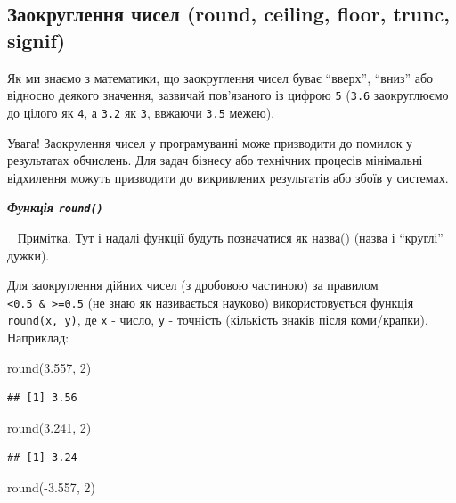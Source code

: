 \documentclass[
]{book}
\newenvironment{Shaded}{\begin{snugshade}}{\end{snugshade}}
\newcommand{\DecValTok}[1]{\textcolor[rgb]{0.00,0.00,0.81}{#1}}
\newcommand{\FloatTok}[1]{\textcolor[rgb]{0.00,0.00,0.81}{#1}}
\newcommand{\FunctionTok}[1]{\textcolor[rgb]{0.00,0.00,0.00}{#1}}
\newcommand{\NormalTok}[1]{#1}
\newcommand{\SpecialCharTok}[1]{\textcolor[rgb]{0.00,0.00,0.00}{#1}}
\begin{document}
\hypertarget{chapter241}{%
\subsection{Заокруглення чисел (round, ceiling, floor, trunc, signif)}\label{chapter241}}

Як ми знаємо з математики, що заокруглення чисел буває ``вверх'', ``вниз'' або відносно деякого значення, зазвичай пов'язаного із цифрою \texttt{5} (\texttt{3.6} заокруглюємо до цілого як \texttt{4}, а \texttt{3.2} як \texttt{3}, ввжаючи \texttt{3.5} межею).

Увага! Заокрулення чисел у програмуванні може призводити до помилок у результатах обчислень. Для задач бізнесу або технічних процесів мінімальні відхилення можуть призводити до викривлених результатів або збоїв у системах.

\emph{\textbf{Функція \texttt{round()}}}

~ Примітка. Тут і надалі функції будуть позначатися як назва() (назва і ``круглі'' дужки).

Для заокруглення дійних чисел (з дробовою частиною) за правилом \texttt{\textless{}0.5\ \&\ \textgreater{}=0.5} (не знаю як називається науково) використовується функція \texttt{round(x,\ y)}, де \texttt{x} - число, \texttt{y} - точність (кількість знаків після коми/крапки). Наприклад:

\begin{Shaded}
\begin{Highlighting}[]
\FunctionTok{round}\NormalTok{(}\FloatTok{3.557}\NormalTok{, }\DecValTok{2}\NormalTok{)}
\end{Highlighting}
\end{Shaded}

\begin{verbatim}
## [1] 3.56
\end{verbatim}

\begin{Shaded}
\begin{Highlighting}[]
\FunctionTok{round}\NormalTok{(}\FloatTok{3.241}\NormalTok{, }\DecValTok{2}\NormalTok{)}
\end{Highlighting}
\end{Shaded}

\begin{verbatim}
## [1] 3.24
\end{verbatim}

\begin{Shaded}
\begin{Highlighting}[]
\FunctionTok{round}\NormalTok{(}\SpecialCharTok{{-}}\FloatTok{3.557}\NormalTok{, }\DecValTok{2}\NormalTok{)}
\end{Highlighting}
\end{Shaded}
\end{document}
